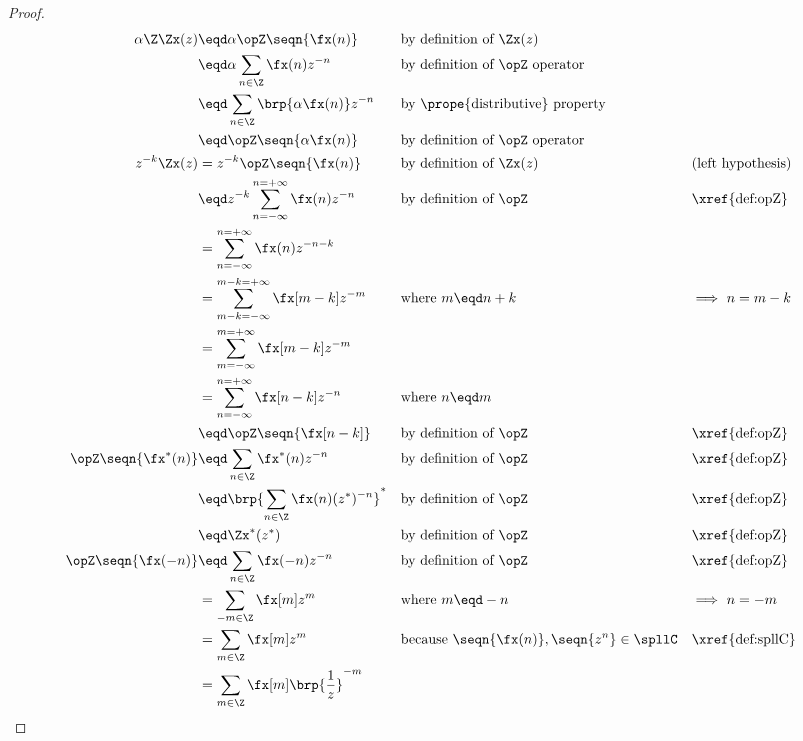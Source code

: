 \begin{proof}
\begin{align*}
  \alpha\Z\Zx(z)
    &\eqd \alpha \opZ \seqn{\fx(n)}                && \text{by definition of $\Zx(z)$}
  \\&\eqd \alpha \sum_{n\in\Z} \fx(n) z^{-n}       && \text{by definition of $\opZ$ operator}
  \\&\eqd \sum_{n\in\Z} \brp{\alpha\fx(n)} z^{-n}  && \text{by \prope{distributive} property}
  \\&\eqd \opZ\seqn{\alpha\fx(n)}                  && \text{by definition of $\opZ$ operator}
  \\
  z^{-k}\Zx(z) 
    &= z^{-k} \opZ\seqn{\fx(n)}
    && \text{by definition of $\Zx(z)$}
    && \text{(left hypothesis)}
  \\&\eqd z^{-k}\sum_{n=-\infty}^{n=+\infty} \fx(n) z^{-n}
    && \text{by definition of $\opZ$}
    && \text{\xref{def:opZ}}
  \\&=          \sum_{n=-\infty}^{n=+\infty} \fx(n) z^{-n-k}
  \\&=          \sum_{m-k=-\infty}^{m-k=+\infty} \fx[m-k] z^{-m}
    && \text{where $m\eqd n+k$}
    && \text{$\implies$ $n=m-k$}
  \\&=          \sum_{m=-\infty}^{m=+\infty} \fx[m-k] z^{-m}
  \\&=          \sum_{n=-\infty}^{n=+\infty} \fx[n-k] z^{-n}
    && \text{where $n\eqd m$}
  \\&\eqd \opZ\seqn{\fx[n-k]}
    && \text{by definition of $\opZ$}
    && \text{\xref{def:opZ}}
  \\
  \opZ\seqn{\fx^\ast(n)}  
    &\eqd \sum_{n\in\Z}\fx^\ast(n) z^{-n}
    && \text{by definition of $\opZ$}
    && \text{\xref{def:opZ}}
  \\&\eqd \brp{\sum_{n\in\Z}\fx(n) (z^\ast)^{-n}}^\ast
    && \text{by definition of $\opZ$}
    && \text{\xref{def:opZ}}
  \\&\eqd \Zx^\ast(z^\ast)
    && \text{by definition of $\opZ$}
    && \text{\xref{def:opZ}}
  \\
  \opZ\seqn{\fx(-n)}  
    &\eqd \sum_{n\in\Z}\fx(-n) z^{-n}
    && \text{by definition of $\opZ$}
    && \text{\xref{def:opZ}}
  \\&= \sum_{-m\in\Z}\fx[m] z^{m}
    && \text{where $m\eqd -n$}
    && \text{$\implies$ $n=-m$}
  \\&= \sum_{m\in\Z}\fx[m] z^{m}
    && \text{because $\seqn{\fx(n)},\seqn{z^n}\in\spllC$}     && \text{\xref{def:spllC}}
  \\&= \sum_{m\in\Z}\fx[m] \brp{\frac{1}{z}}^{-m}

\end{align*}
\end{proof}
